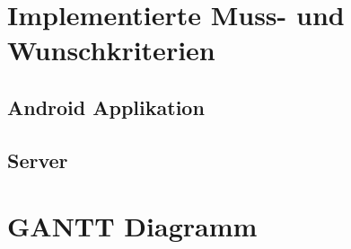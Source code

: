 \documentclass[a4paper]{scrreprt}
\begin{document}
        \newpage
    \chapter{Implementierte Muss- und Wunschkriterien}


        \section{Android Applikation}





        \section{Server}


           \newpage
    \chapter{GANTT Diagramm}
\end{document}
